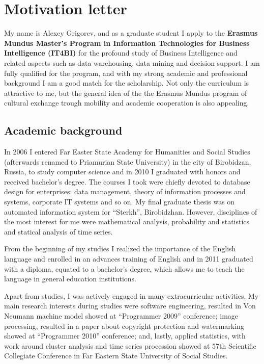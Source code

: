 \documentclass[a4paper,14pt]{extarticle}
\begin{document}
\section*{Motivation letter}

My name is Alexey Grigorev, and as a graduate student I apply to the \textbf{Erasmus Mundus Master's Program in Information Technologies for Business Intelligence (IT4BI)} for the profound study of Business Intelligence and related aspects such as data warehousing, data mining and decision support. I am fully qualified for the program, and with my strong academic and professional background I am a good match for the scholarship. Not only the curriculum is attractive to me, but the general idea of the the Erasmus Mundus program of cultural exchange trough mobility and academic cooperation is also appealing.

\subsection*{Academic background}

In 2006 I entered Far Easter State Academy for Humanities and Social Studies (afterwards renamed to Priamurian State University) in the city of Birobidzan, Russia, to study computer science and in 2010 I graduated with honors and received bachelor's degree. The courses I took were chiefly devoted to database design for enterprises: data management, theory of information processes and systems, corporate IT systems and so on. My final graduate thesis was on automated information system for ``Sterkh'', Birobidzhan. However, disciplines of the most interest for me were mathematical analysis, probability and statistics and statical analysis of time series.

From the beginning of my studies I realized the importance of the English language and enrolled in an advances training of English and in 2011 graduated with a diploma, equated to a bachelor's degree, which allows me to teach the language in general education institutions.

Apart from studies, I was actively engaged in many extracurricular activities. My main research interests during studies were software engineering, resulted in Von Neumann machine model showed at ``Programmer 2009'' conference; image processing, resulted in a paper about copyright protection and watermarking showed at ``Programmer 2010'' conference; and, lastly, applied statistics, with work around cluster analysis and time series procession showed at 57th Scientific Collegiate Conference in Far Eastern State University of Social Studies.
\end{document}
